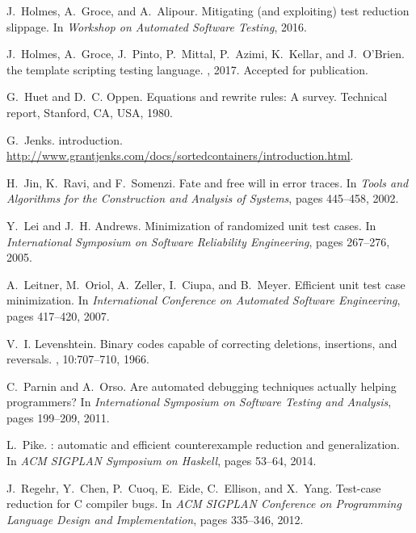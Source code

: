 \documentclass[sigconf]{acmart}
\begin{document}
\begin{thebibliography}{10}
J.~Holmes, A.~Groce, and A.~Alipour.
\newblock Mitigating (and exploiting) test reduction slippage.
\newblock In {\em Workshop on Automated Software Testing}, 2016.

J.~Holmes, A.~Groce, J.~Pinto, P.~Mittal, P.~Azimi, K.~Kellar, and J.~O'Brien.
 the template scripting testing language.
, 2017.
\newblock Accepted for publication.

G.~Huet and D.~C. Oppen.
\newblock Equations and rewrite rules: A survey.
\newblock Technical report, Stanford, CA, USA, 1980.

G.~Jenks.
 introduction.
\newblock
  \url{http://www.grantjenks.com/docs/sortedcontainers/introduction.html}.

H.~Jin, K.~Ravi, and F.~Somenzi.
\newblock Fate and free will in error traces.
\newblock In {\em Tools and Algorithms for the Construction and Analysis of
  Systems}, pages 445--458, 2002.

Y.~Lei and J.~H. Andrews.
\newblock Minimization of randomized unit test cases.
\newblock In {\em International Symposium on Software Reliability Engineering},
  pages 267--276, 2005.

A.~Leitner, M.~Oriol, A.~Zeller, I.~Ciupa, and B.~Meyer.
\newblock Efficient unit test case minimization.
\newblock In {\em International Conference on Automated Software Engineering},
  pages 417--420, 2007.

V.~I. Levenshtein.
\newblock Binary codes capable of correcting deletions, insertions, and
  reversals.
, 10:707--710, 1966.

C.~Parnin and A.~Orso.
\newblock Are automated debugging techniques actually helping programmers?
\newblock In {\em International Symposium on Software Testing and Analysis},
  pages 199--209, 2011.

L.~Pike.
: automatic and efficient counterexample reduction and
  generalization.
\newblock In {\em {ACM} {SIGPLAN} Symposium on Haskell}, pages 53--64, 2014.

J.~Regehr, Y.~Chen, P.~Cuoq, E.~Eide, C.~Ellison, and X.~Yang.
\newblock Test-case reduction for {C} compiler bugs.
\newblock In {\em ACM SIGPLAN Conference on Programming Language Design and
  Implementation}, pages 335--346, 2012.


\end{thebibliography}
\end{document}
